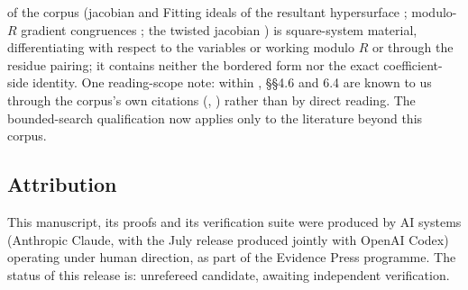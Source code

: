 \documentclass[11pt,reqno]{amsart}
\theoremstyle{definition}
\theoremstyle{remark}
\begin{document}
of the corpus (jacobian and Fitting ideals of the resultant
hypersurface \cite[3.5.3--3.5.4]{JouanolouAspects}; modulo-$R$
gradient congruences \cite[3.7.1]{JouanolouAspects}; the twisted
jacobian \cite[3.8]{JouanolouAspects}) is square-system material,
differentiating with respect to the variables or working modulo
$R$ or through the residue pairing; it contains neither the
bordered form nor the exact coefficient-side identity.  One
reading-scope note: within \cite{Jouanolou1991}, \S\S4.6 and 6.4
are known to us through the corpus's own citations
(\cite[3.5.4, 3.7.1.4]{JouanolouAspects},
\cite[3.10.15]{JouanolouFormulaire}) rather than by direct
reading.  The bounded-search qualification now applies only to the
literature beyond this corpus.

\subsection*{Attribution}
This manuscript, its proofs and its verification suite were produced
by AI systems (Anthropic Claude, with the July release produced
jointly with OpenAI Codex) operating under human direction, as part
of the Evidence Press programme.  The status of this release is:
unrefereed candidate, awaiting independent verification.
\end{document}
